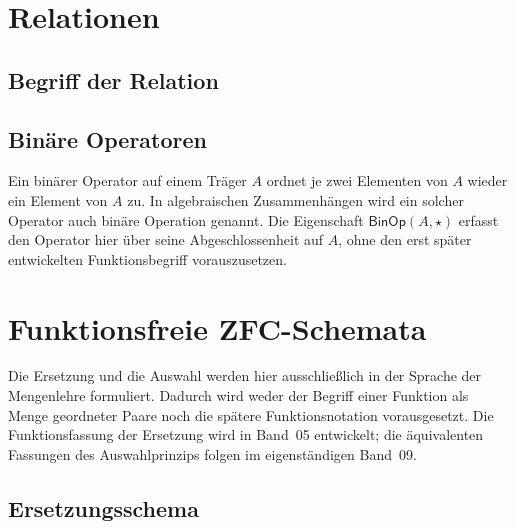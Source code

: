 \documentclass[main.tex]{subfiles}
\begin{document}
\chapter{Relationen}

\section{Begriff der Relation}


\section{Binäre Operatoren}

Ein binärer Operator auf einem Träger \(A\) ordnet je zwei Elementen von
\(A\) wieder ein Element von \(A\) zu. In algebraischen Zusammenhängen wird
ein solcher Operator auch binäre Operation genannt. Die Eigenschaft
\(\mathsf{BinOp}\!\left(A,\star\right)\) erfasst den Operator hier über seine
Abgeschlossenheit auf \(A\), ohne den erst später entwickelten Funktionsbegriff
vorauszusetzen.



\chapter{Funktionsfreie ZFC-Schemata}

Die Ersetzung und die Auswahl werden hier ausschließlich in der Sprache der
Mengenlehre formuliert. Dadurch wird weder der Begriff einer Funktion als
Menge geordneter Paare noch die spätere Funktionsnotation vorausgesetzt. Die
Funktionsfassung der Ersetzung wird in Band~05 entwickelt; die äquivalenten
Fassungen des Auswahlprinzips folgen im eigenständigen Band~09.

\section{Ersetzungsschema}
\end{document}
